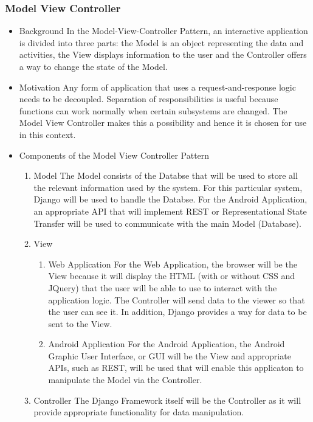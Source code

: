 \documentclass[a4paper,12pt]{article}
\begin{document}
\subsubsection{Model View Controller}
\begin{itemize}
\item{Background}
\newline
\newline
In the Model-View-Controller Pattern, an interactive application is divided into three parts: the Model is an object representing the data and activities, the View displays information to the user and the Controller offers a way to change the state of the Model.

\item{Motivation}
\newline
\newline
Any form of application that uses a request-and-response logic needs to be decoupled. Separation of responsibilities is useful because functions can work normally when certain subsystems are changed. The Model View Controller makes this a possibility and hence it is chosen for use in this context. 

\item{Components of the Model View Controller Pattern}
\begin{enumerate}
\item{Model}
\newline
The Model consists of the Databse that will be used to store all the relevant information used by the system. For this particular system, Django will be used to handle the Databse. For the Android Application, an appropriate API that will implement REST or Representational State Transfer will be used to communicate with the main Model (Database).
\newline

\item{View}
\begin{enumerate}
\item{Web Application}
\newline
For the Web Application, the browser will be the View because it will display the HTML (with or without CSS and JQuery) that the user will be able to use to interact with the application logic. The Controller will send data to the viewer so that the user can see it. In addition, Django provides a way for data to be sent to the View.
\newline
\item{Android Application}
\newline
For the Android Application, the Android Graphic User Interface, or GUI will be the View and appropriate APIs, such as REST, will be used that will enable this applicaton to manipulate the Model via the Controller.
\end{enumerate}

\item{Controller}
\newline
The Django Framework itself will be the Controller as it will provide appropriate functionality for data manipulation.

\end{enumerate}
\end{itemize}
\end{document}

